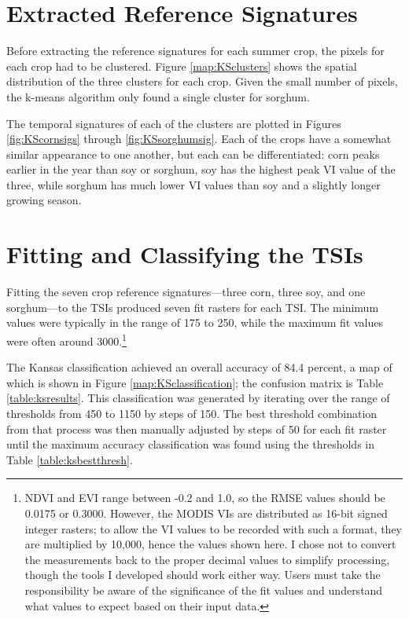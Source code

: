 \section{Extracted Reference Signatures}

Before extracting the reference signatures for each summer crop, the pixels for each crop had to be clustered. Figure \ref{map:KSclusters} shows the spatial distribution of the three clusters for each crop. Given the small number of pixels, the k-means algorithm only found a single cluster for sorghum.

The temporal signatures of each of the clusters are plotted in Figures \ref{fig:KScornsigs} through \ref{fig:KSsorghumsig}. Each of the crops have a somewhat similar appearance to one another, but each can be differentiated: corn peaks earlier in the year than soy or sorghum, soy has the highest peak VI value of the three, while sorghum has much lower VI values than soy and a slightly longer growing season.



\section{Fitting and Classifying the TSIs}

Fitting the seven crop reference signatures---three corn, three soy, and one sorghum---to the TSIs produced seven fit rasters for each TSI. The minimum values were typically in the range of 175 to 250, while the maximum fit values were often around 3000.\footnote{NDVI and EVI range between -0.2 and 1.0, so the RMSE values should be 0.0175 or 0.3000. However, the MODIS VIs are distributed as 16-bit signed integer rasters; to allow the VI values to be recorded with such a format, they are multiplied by 10,000, hence the values shown here. I chose not to convert the measurements back to the proper decimal values to simplify processing, though the tools I developed should work either way.  Users must take the responsibility be aware of the significance of the fit values and understand what values to expect based on their input data.} 

The Kansas classification achieved an overall accuracy of 84.4 percent, a map of which is shown in Figure \ref{map:KSclassification}; the confusion matrix is Table \ref{table:ksresults}. This classification was generated by iterating over the range of thresholds from 450 to 1150 by steps of 150. The best threshold combination from that process was then manually adjusted by steps of 50 for each fit raster until the maximum accuracy classification was found using the thresholds in Table \ref{table:ksbestthresh}.


